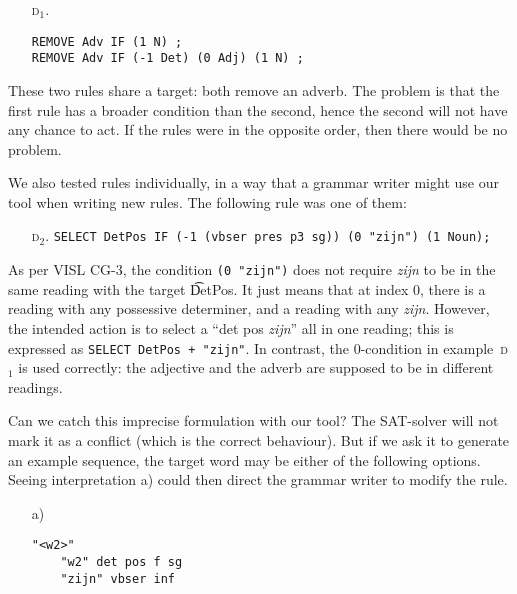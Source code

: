 {{\begin{itemize}
\item[\textsc{d$_1$.}]
\begin{verbatim}
REMOVE Adv IF (1 N) ;
REMOVE Adv IF (-1 Det) (0 Adj) (1 N) ;
\end{verbatim}
\end{itemize}

\noindent These two rules share a target: both remove an adverb.
The problem is that the first rule has a broader condition than the second, hence the second will not have any chance to act.
If the rules were in the opposite order, then there would be no problem.



We also tested rules individually, in a way that a grammar writer might use our tool when writing new rules.
The following rule was one of them:

\begin{itemize}
\item[\textsc{d$_2$.}]
\texttt{SELECT DetPos IF (-1 (vbser pres p3 sg)) (0 "zijn") (1 Noun);}
\end{itemize}

\noindent As per VISL CG-3, the condition \texttt{(0 "zijn")} does not require
 \emph{zijn} to be in the same reading with the target \t{DetPos}.
It just means that at index 0,
there is a reading with any possessive determiner, and a reading with any \emph{zijn}.
However, the intended action is to select a ``det pos \emph{zijn}'' all in one reading;
this is expressed as \texttt{SELECT DetPos + "zijn"}.
In contrast, the 0-condition in example~\textsc{d$_1$} is used correctly:
the adjective and the adverb are supposed to be in different readings.


Can we catch this imprecise formulation with our tool? The SAT-solver will not mark it as a conflict (which is the correct behaviour). But if we ask it to generate an example sequence, the target word may be either of the following options. Seeing interpretation a) could then direct the grammar writer to modify the rule.

\begin{itemize}
\item[a)] \begin{verbatim}
"<w2>"
    "w2" det pos f sg
    "zijn" vbser inf
\end{verbatim}


\end{itemize}}}
